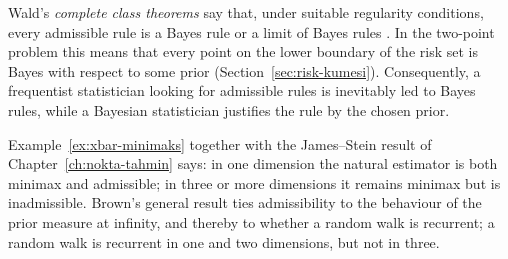 \documentclass[main.tex]{subfiles}
\begin{document}
\begin{remark}
Wald's \emph{complete class theorems} say that, under suitable regularity conditions, every admissible rule is a Bayes rule or a limit of Bayes rules \cite{wald50,berger85}. In the two-point problem this means that every point on the lower boundary of the risk set is Bayes with respect to some prior (Section~\ref{sec:risk-kumesi}). Consequently, a frequentist statistician looking for admissible rules is inevitably led to Bayes rules, while a Bayesian statistician justifies the rule by the chosen prior.
\end{remark}

\begin{remark}
Example~\ref{ex:xbar-minimaks} together with the James--Stein result of Chapter~\ref{ch:nokta-tahmin} says: in one dimension the natural estimator is both minimax and admissible; in three or more dimensions it remains minimax but is inadmissible. Brown's \cite{brown71} general result ties admissibility to the behaviour of the prior measure at infinity, and thereby to whether a random walk is recurrent; a random walk is recurrent in one and two dimensions, but not in three.
\end{remark}

\end{document}
